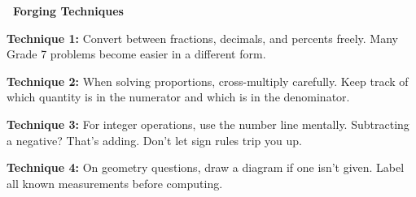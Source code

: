 {\vspace{2mm}

\noindent\textcolor{funOrangeDark}{\large\bfseries\faFire~Forging Techniques}

\vspace{2mm}

\noindent
\begin{minipage}[t]{0.48\linewidth}
    \begin{tcolorbox}[
        enhanced,
        colback=funRed!5,
        colframe=funRed!30,
        arc=6pt, boxrule=1pt,
        left=3mm, right=3mm, top=2mm, bottom=2mm,
    ]
        \small
        \textcolor{funRedDark}{\bfseries Technique 1:}
        Convert between fractions, decimals, and percents
        freely. Many Grade 7 problems become easier in a different form.
    \end{tcolorbox}

    \vspace{1.5mm}

    \begin{tcolorbox}[
        enhanced,
        colback=funOrange!5,
        colframe=funOrange!30,
        arc=6pt, boxrule=1pt,
        left=3mm, right=3mm, top=2mm, bottom=2mm,
    ]
        \small
        \textcolor{funOrangeDark}{\bfseries Technique 2:}
        When solving proportions, cross-multiply carefully.
        Keep track of which quantity is in the numerator and
        which is in the denominator.
    \end{tcolorbox}

    \vspace{1.5mm}

    \begin{tcolorbox}[
        enhanced,
        colback=funYellow!8,
        colframe=funYellowDark!35,
        arc=6pt, boxrule=1pt,
        left=3mm, right=3mm, top=2mm, bottom=2mm,
    ]
        \small
        \textcolor{funYellowDark}{\bfseries Technique 3:}
        For integer operations, use the number line mentally.
        Subtracting a negative? That's adding. Don't let
        sign rules trip you up.
    \end{tcolorbox}
\end{minipage}%
\hfill
\begin{minipage}[t]{0.48\linewidth}
    \begin{tcolorbox}[
        enhanced,
        colback=funGreen!5,
        colframe=funGreen!30,
        arc=6pt, boxrule=1pt,
        left=3mm, right=3mm, top=2mm, bottom=2mm,
    ]
        \small
        \textcolor{funGreenDark}{\bfseries Technique 4:}
        On geometry questions, draw a diagram if one isn't given.
        Label all known measurements before computing.
    \end{tcolorbox}


\end{minipage}}
